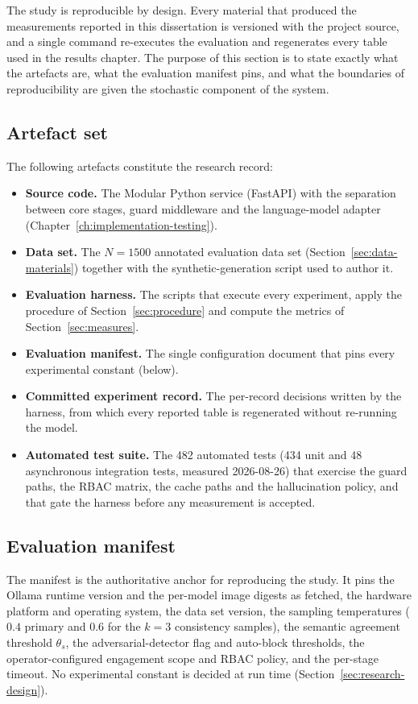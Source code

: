 The study is reproducible by design. Every material that produced the
measurements reported in this dissertation is versioned with the project
source, and a single command re-executes the evaluation and regenerates every
table used in the results chapter. The purpose of this section is to state
exactly what the artefacts are, what the evaluation manifest pins, and what the
boundaries of reproducibility are given the stochastic component of the system.

\subsection*{Artefact set}

The following artefacts constitute the research record:
\begin{itemize}
\item \textbf{Source code.} The Modular Python service (FastAPI) with the
separation between core stages, guard middleware and the language-model adapter
(Chapter~\ref{ch:implementation-testing}).
\item \textbf{Data set.} The $N{=}1500$ annotated evaluation data set
(Section~\ref{sec:data-materials}) together with the synthetic-generation
script used to author it.
\item \textbf{Evaluation harness.} The scripts that execute every experiment,
apply the procedure of Section~\ref{sec:procedure} and compute the metrics of
Section~\ref{sec:measures}.
\item \textbf{Evaluation manifest.} The single configuration document that pins
every experimental constant (below).
\item \textbf{Committed experiment record.} The per-record decisions written by
the harness, from which every reported table is regenerated without re-running
the model.
\item \textbf{Automated test suite.} The 482 automated tests (434 unit and 48
asynchronous integration tests, measured 2026-08-26) that exercise the guard
paths, the RBAC matrix, the cache paths and the hallucination policy, and that
gate the harness before any measurement is accepted.
\end{itemize}

\subsection*{Evaluation manifest}

The manifest is the authoritative anchor for reproducing the study. It pins the
Ollama runtime version and the per-model image digests as fetched, the hardware
platform and operating system, the data set version, the sampling temperatures
($0.4$ primary and $0.6$ for the $k{=}3$ consistency samples), the semantic
agreement threshold $\theta_s$, the adversarial-detector flag and auto-block
thresholds, the operator-configured engagement scope and RBAC policy, and the
per-stage timeout. No experimental constant is decided at run time
(Section~\ref{sec:research-design}).

